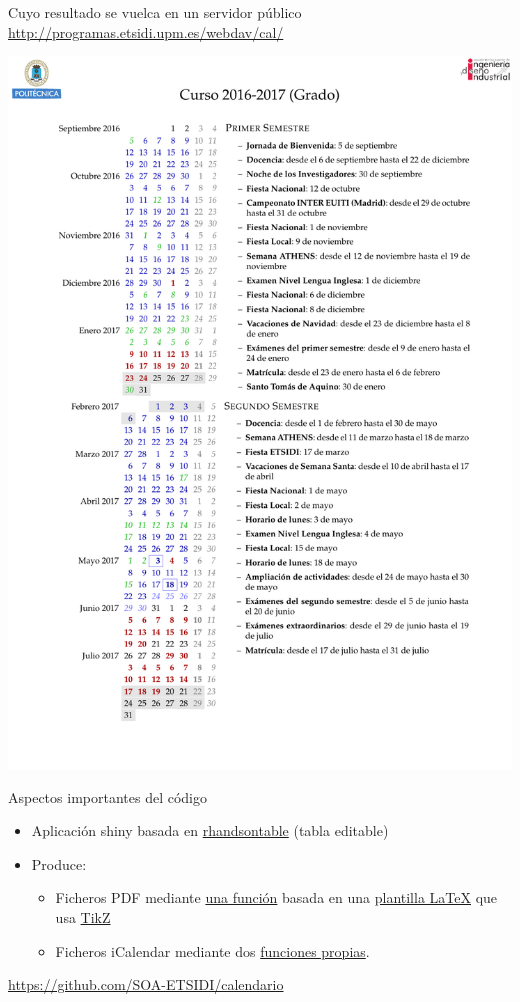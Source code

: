 \documentclass[spanish, xcolor={usenames,svgnames,dvipsnames}]{beamer}
\begin{document}
\begin{frame}[label={sec:org09b8e21}]{Cuyo resultado se vuelca en un servidor público}
\url{http://programas.etsidi.upm.es/webdav/cal/}

\begin{center}
\includegraphics[width=.9\linewidth]{images/Calendario_Grado_2016_2017.pdf}
\end{center}
\end{frame}

\begin{frame}[label={sec:orgb2aa798}]{Aspectos importantes del código}
\begin{itemize}
\item Aplicación shiny basada en \href{http://jrowen.github.io/rhandsontable/}{rhandsontable} (tabla editable)
\item Produce:
\begin{itemize}
\item Ficheros PDF mediante \href{https://github.com/SOA-ETSIDI/calendario/blob/master/csv2pdf.R}{una función} basada en una \href{https://github.com/SOA-ETSIDI/calendario/blob/master/documentCal.tex}{plantilla \LaTeX{}} que usa \href{https://en.wikipedia.org/wiki/PGF/TikZ}{TikZ}
\item Ficheros iCalendar mediante dos \href{https://github.com/SOA-ETSIDI/calendario/blob/master/csv2ics.R}{funciones propias}.
\end{itemize}
\end{itemize}
\begin{block}{}
\url{https://github.com/SOA-ETSIDI/calendario}
\end{block}
\end{frame}
\end{document}
